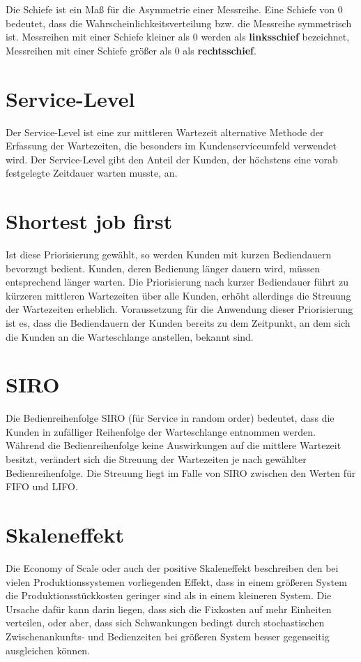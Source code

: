 Die Schiefe ist ein Maß für die Asymmetrie einer Messreihe.
Eine Schiefe von 0 bedeutet, dass die Wahrscheinlichkeitsverteilung bzw. die Messreihe symmetrisch ist.
Messreihen mit einer Schiefe kleiner als 0 werden als \textbf{linksschief} bezeichnet,
Messreihen mit einer Schiefe größer als 0 als \textbf{rechtsschief}.

\section*{Service-Level}


Der Service-Level ist eine zur mittleren Wartezeit alternative Methode der Erfassung der Wartezeiten,
die besonders im Kundenserviceumfeld verwendet wird. Der Service-Level gibt den Anteil der Kunden,
der höchstens eine vorab festgelegte Zeitdauer warten musste, an.

\section*{Shortest job first}


Ist diese Priorisierung gewählt, so werden Kunden mit kurzen Bediendauern bevorzugt bedient.
Kunden, deren Bedienung länger dauern wird, müssen entsprechend länger warten.
Die Priorisierung nach kurzer Bediendauer führt zu kürzeren mittleren Wartezeiten über alle Kunden,
erhöht allerdings die Streuung der Wartezeiten erheblich.
Voraussetzung für die Anwendung dieser Priorisierung ist es,
dass die Bediendauern der Kunden bereits zu dem Zeitpunkt,
an dem sich die Kunden an die Warteschlange anstellen, bekannt sind.

\section*{SIRO}


Die Bedienreihenfolge SIRO (für Service in random order) bedeutet, dass die Kunden in zufälliger Reihenfolge
der Warteschlange entnommen werden. Während die Bedienreihenfolge keine Auswirkungen auf die mittlere Wartezeit besitzt,
verändert sich die Streuung der Wartezeiten je nach gewählter Bedienreihenfolge. Die Streuung liegt im Falle von SIRO
zwischen den Werten für FIFO und LIFO.

\section*{Skaleneffekt}


Die Economy of Scale oder auch der positive Skaleneffekt beschreiben den bei vielen Produktionssystemen
vorliegenden Effekt, dass in einem größeren System die Produktionsstückkosten geringer sind als in
einem kleineren System. Die Ursache dafür kann darin liegen, dass sich die Fixkosten auf mehr Einheiten
verteilen, oder aber, dass sich Schwankungen bedingt durch stochastischen Zwischenankunfts- und Bedienzeiten
bei größeren System besser gegenseitig ausgleichen können.

